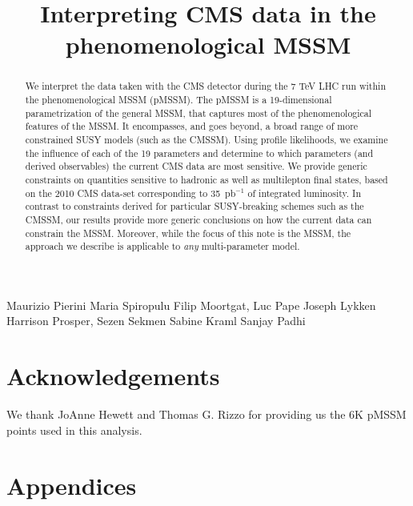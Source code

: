 \documentclass{cmspaper}
\begin{document}
%
\begin{titlepage}
\title{Interpreting CMS data in the phenomenological MSSM}

  \begin{Authlist}
    Maurizio Pierini
    Maria Spiropulu
    Filip Moortgat, Luc Pape
    Joseph Lykken
    Harrison Prosper, Sezen Sekmen
    Sabine Kraml
    Sanjay Padhi
    
  \end{Authlist}

\begin{abstract}
We interpret the data taken with the CMS detector during the 7 TeV LHC run within the phenomenological MSSM (pMSSM). 
The pMSSM is a 19-dimensional parametrization of the general MSSM, that captures most of the phenomenological features of the MSSM.
It encompasses, and goes beyond, a broad range of more constrained SUSY models (such as the CMSSM). 
Using profile likelihoods, we examine the influence of each of the 
19 parameters and determine to which parameters 
(and derived observables) the current CMS data are most sensitive. 
We provide generic constraints on quantities sensitive to hadronic as well as multilepton final states, 
based on the 2010 CMS data-set corresponding to 35~pb$^{-1}$ of integrated luminosity.
In contrast to constraints derived for particular SUSY-breaking schemes 
such as the CMSSM, our results provide more generic conclusions on how the current 
data can constrain the MSSM. 
Moreover, while the focus of this note is the 
MSSM, the approach we describe is applicable to \emph{any} multi-parameter model.
\end{abstract}
\end{titlepage}




%




\section*{Acknowledgements}

We thank JoAnne Hewett and Thomas G. Rizzo for providing us the 6K pMSSM points used in this analysis.



%
%
\clearpage


\clearpage
\appendices
\section*{Appendices}

\clearpage

\end{document}
